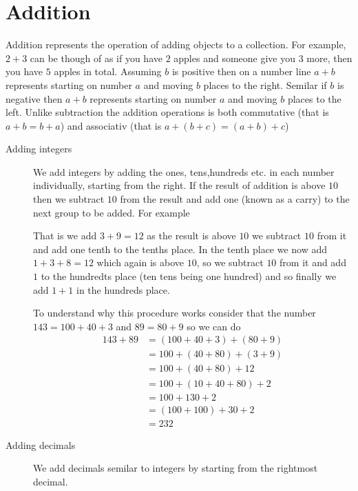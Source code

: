 \newpage
\section{Addition}
Addition represents the operation of adding objects to a collection. For example, $2+3$ can be though of as if you have $2$ apples and someone give you $3$ more, then you have $5$ apples in total. Assuming $b$ is positive then on a number line $a+b$ represents starting on number $a$ and moving $b$ places to the right. Semilar if $b$ is negative then $a+b$ represents starting on number $a$ and moving $b$ places to the left. Unlike subtraction the addition operations is both commutative (that is $a + b = b + a$) and associativ (that is $a + (b + c) = (a + b) + c$)

\begin{description}
\item [Adding integers] We add integers by adding the ones, tens,hundreds etc. in each number individually, starting from the right. If the result of addition is above $10$ then we subtract $10$ from the result and add one (known as a carry) to the next group to be added. For example
\begin{figure}[H]
\centering
{}
\end{figure}
That is we add $3+9=12$ as the result is above $10$ we subtract $10$ from it and add one tenth to the tenths place. In the tenth place we now add $1+3+8=12$ which again is above $10$, so we subtract $10$ from it and add $1$ to the hundredts place (ten tens being one hundred) and so finally we add $1+1$ in the hundreds place.

To understand why this procedure works consider that the number $143 = 100 + 40 + 3$ and $89 = 80 + 9$ so we can do
\[
\begin{align}
143 + 89 &= (100 + 40 + 3) + (80 + 9) \\
         &= 100 + (40+80) + (3+9)     \\
         &= 100 + (40+80) + 12        \\
         &= 100 + (10+40+80) + 2      \\
         &= 100 + 130 + 2             \\
         &= (100 + 100) + 30 + 2      \\
         &= 232
\end{align}
\]
\item [Adding decimals] We add decimals semilar to integers by starting
from the rightmost decimal.
\begin{figure}[H]
\centering
{}
\end{figure}
\end{description}

